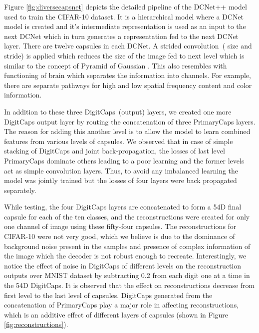 \documentclass{bmvc2k}
\begin{document}
Figure \ref{fig:diversecapsnet} depicts the detailed pipeline of the DCNet++ model used to train the CIFAR-10 dataset. It is a hierarchical model where a DCNet model is created and it's intermediate representation is used as an input to the next DCNet which in turn generates a representation fed to the next DCNet layer. There are twelve capsules in each DCNet. A strided convolution~( size and  stride) is applied which reduces the size of the image fed to next level which is similar to the concept of Pyramid of Gaussian \cite{pyramid}. This also resembles with functioning of brain which separates the information into channels. For example, there are separate pathways for high and low spatial frequency content and color information.




In addition to these three DigitCaps~(output) layers, we created one more DigitCaps output layer by routing the concatenation of three PrimaryCaps layers. The reason for adding this another level is to allow  the model to learn combined features from various levels of capsules.
We observed that in case of simple stacking of DigitCaps and joint back-propagation, the losses of last level PrimaryCaps dominate others leading to a poor learning and the former levels act as simple convolution layers. Thus, to avoid any imbalanced learning the model was jointly trained but the losses of four layers were back propagated separately.

While testing, the four DigitCaps layers are concatenated to form a 54D final capsule for each of the ten classes, and the reconstructions were created for only one channel of image using these fifty-four capsules. The reconstructions for CIFAR-10 were not very good, which we believe is due to the dominance of background noise present in the samples and presence of complex information of the image which the decoder is not robust enough to recreate. Interestingly, we notice the effect of noise in DigitCaps of different levels on the reconstruction outputs over MNIST dataset by subtracting 0.2 from each digit one at a time in the 54D DigitCaps. It is observed that the effect on reconstructions decrease from first level to the last level of capsules. DigitCaps generated from the concatenation of PrimaryCaps play a major role in affecting reconstructions, which is an additive effect of different layers of capsules (shown in Figure \ref{fig:reconstructions}).
\end{document}
